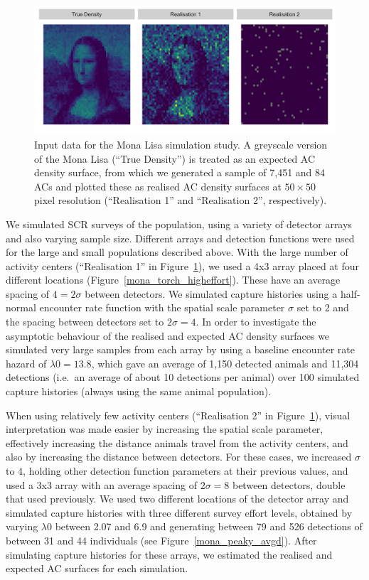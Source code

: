\documentclass[10pt,a4paper]{article}
\begin{document}
\begin{figure}[htbp]
\centering
\includegraphics[width=1\textwidth]{mona_inputdata.png}
\caption{Input data for the Mona Lisa simulation study. A greyscale version of the Mona Lisa (``True Density'') is treated as an expected AC density surface, from which we generated a sample of 7,451 and 84 ACs and plotted these as realised AC density surfaces at $50\times 50$ pixel resolution (``Realisation 1'' and ``Realisation 2'', respectively).}
\label{mlinputs}
\end{figure}

We simulated SCR surveys of the population, using a variety of detector arrays and also varying sample size. Different arrays and detection functions were used for the large and small populations described above. With the large number of activity centers (``Realisation 1'' in Figure~\ref{mlinputs}), we used a 4x3 array placed at four different locations (Figure~\ref{mona_torch_higheffort}). These have an average spacing of $4=2\sigma$ between detectors. We simulated capture histories using a half-normal encounter rate function with the spatial scale parameter $\sigma$ set to 2 and the spacing between detectors set to $2\sigma=4$. In order to investigate the asymptotic behaviour of the realised and expected AC density surfaces we simulated very large samples from each array by using a baseline encounter rate hazard of $\lambda0=13.8$, which gave an average of 1,150 detected animals and 11,304 detections (i.e.\ an average of about 10 detections per animal) over 100 simulated capture histories (always using the same animal population). 

When using relatively few activity centers (``Realisation 2'' in Figure~\ref{mlinputs}), visual interpretation was made easier by increasing the spatial scale parameter, effectively increasing the distance animals travel from the activity centers, and also by increasing the distance between detectors. For these cases, we increased $\sigma$ to 4, holding other detection function parameters at their previous values, and used a 3x3 array with an average spacing of $2\sigma=8$ between detectors, double that used previously. We used two different locations of the detector array and simulated capture histories with three different survey effort levels, obtained by varying $\lambda0$ between 2.07 and 6.9 and generating between 79 and 526 detections of between 31 and 44 individuals (see Figure~\ref{mona_peaky_avgd}). After simulating capture histories for these arrays, we estimated the realised and expected AC surfaces for each simulation. 
\end{document}
